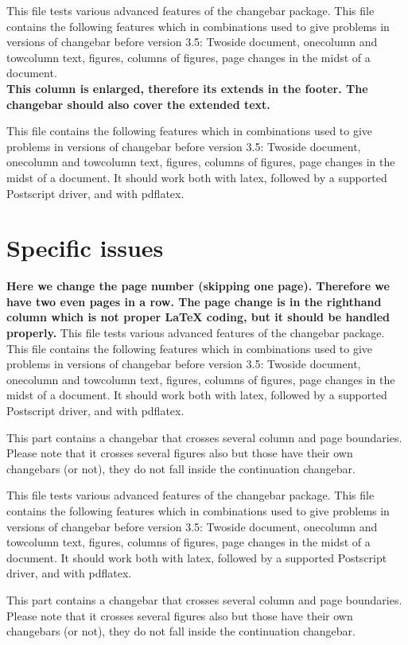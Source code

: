 \documentclass[12pt,twoside]{article}
\begin{document}
\noindent\parbox{\linewidth}{%
This file tests various advanced features of the changebar package.
This file contains the following features which in combinations used to
give problems in  versions of changebar before version 3.5:
Twoside document, onecolumn and towcolumn text, figures, columns of
figures, page changes in the midst of a document.
\\
\textbf{This column is enlarged, therefore its extends in the footer. 
The changebar should also cover the extended text.}}

This file contains the following features which in combinations used to
give problems in  versions of changebar before version 3.5:
Twoside document, onecolumn and towcolumn text, figures, columns of
figures, page changes in the midst of a document.
It should work both with latex, followed by a supported Postscript driver,
and with pdflatex.

\section*{Specific issues}

\addtocounter{page}{1}
\textbf{Here we change the page number (skipping one page). Therefore we
  have two even pages in a row. The page change is in the righthand column
  which is not proper LaTeX coding, but it should be handled properly.}
This file tests various advanced features of the changebar package.
This file contains the following features which in combinations used to
give problems in  versions of changebar before version 3.5:
Twoside document, onecolumn and towcolumn text, figures, columns of
figures, page changes in the midst of a document.
It should work both with latex, followed by a supported Postscript driver,
and with pdflatex.

This part contains a changebar that crosses several column and page
boundaries. Please note that it crosses several figures also but those have
their own changebars (or not), they do not fall inside the continuation
changebar.


This file tests various advanced features of the changebar package.
This file contains the following features which in combinations used to
give problems in  versions of changebar before version 3.5:
Twoside document, onecolumn and towcolumn text, figures, columns of
figures, page changes in the midst of a document.
It should work both with latex, followed by a supported Postscript driver,
and with pdflatex.

This part contains a changebar that crosses several column and page
boundaries. Please note that it crosses several figures also but those have
their own changebars (or not), they do not fall inside the continuation
changebar.
\end{document}
